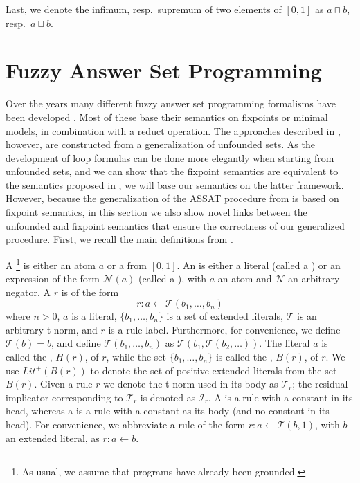 \documentclass{tlp}
\newcommand{\body}[1]{\ensuremath{B(#1)}}
\newcommand{\head}[1]{\ensuremath{H(#1)}}
\newcommand{\poslit}[1]{\ensuremath{Lit^{+}(#1)}}
\newcommand{\fneg}[2]{\ensuremath{\mathcal{N}_{#1}(#2)}}
\newcommand{\bodyfand}[1]{\pretnorm_{#1}}
\newcommand{\rulefimp}[1]{\prefimp_{#1}}
\newcommand{\pretnorm}{\mathcal{T}}
\newcommand{\prefimp}{\mathcal{I}}
\newcommand{\esm}[1]{\ensuremath{#1}}	\newcommand{\mc}[1]{\mathcal{#1}}
\newcommand{\lub}{\esm{\sqcup}}	\newcommand{\glb}{\esm{\sqcap}}	\newcommand{\Lub}{\esm{\bigsqcup}}
\begin{document}
Last, we denote the infimum, resp.~supremum of two elements of $[0,1]$ as $a \glb b$, resp.~$a \lub b$.




\section{Fuzzy Answer Set Programming}\label{sec:FASP}



Over the years many different fuzzy answer set programming formalisms have been developed \cite{Luka06,LukaStraccia07,MadridOjeda-Aciego-2008a,MadridAciego2009,Saad-2009,Straccia:reasoningweb,FASP:amai}. Most of these base their semantics on fixpoints or minimal models, in combination with a reduct operation. The approaches described in \cite{loyer:epistemic,FASP:amai}, however, are constructed from a generalization of unfounded sets. As the development of loop formulas can be done more elegantly when starting from unfounded sets, and we can show that the fixpoint semantics are equivalent to the semantics proposed in \cite{FASP:amai}, we will base our semantics on the latter framework. However, because the generalization of the ASSAT procedure from \cite{assat-linzhao} is based on fixpoint semantics, in this section we also show novel links between the unfounded and fixpoint semantics that ensure the correctness of our generalized procedure. 
First, we recall the main definitions from \cite{FASP:amai}.

A \footnote{As usual, we assume that programs have already been grounded.} is either an atom $a$ or a  from $[0,1]$. An  is either a literal (called a ) or an expression of the form $\fneg{}{a}$ (called a ), with $a$ an atom and $\mathcal{N}$ an arbitrary negator. A  $r$ is of the form 
  $$r: a \gets \pretnorm(b_1,\ldots,b_n)$$
 where $n > 0$, $a$ is a literal, $\{b_1,\ldots,b_n\}$ is a set of extended literals, $\pretnorm$ is an arbitrary t-norm, and $r$ is a rule label. Furthermore, for convenience, we define $\pretnorm(b) = b$, and define $\pretnorm(b_1,\ldots,b_n)$ as $\pretnorm(b_1,\pretnorm(b_2,\ldots))$. The literal $a$ is called the , $\head{r}$, of $r$, while the set $\{b_1,\ldots,b_n\}$ is called the , $\body{r}$, of $r$. We use $\poslit{\body{r}}$ to denote the set of positive extended literals from the set $\body{r}$.
 Given a rule $r$ we denote the t-norm used in its body as $\bodyfand{r}$; the residual implicator corresponding to $\bodyfand{r}$ is denoted as $\rulefimp{r}$.
 A  is a rule with a constant in its head, whereas a  is a rule with a constant as its body (and no
constant in its head). For convenience, we abbreviate a rule of the form $r: a \gets \pretnorm(b,1)$, with $b$ an extended literal, as $r: a \gets b$.
 
\end{document}
